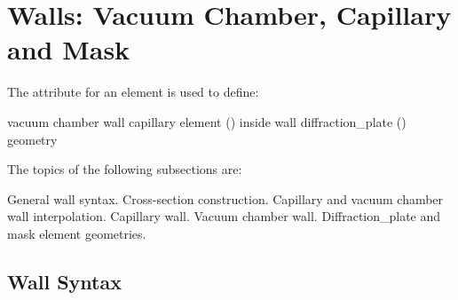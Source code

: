 \section{Walls: Vacuum Chamber, Capillary and Mask}
\label{s:wall}

The  attribute for an element is used to define:
\begin{example}
  vacuum chamber wall
  capillary element () inside wall
  diffraction_plate () geometry
\end{example}

The topics of the following subsections are:
\begin{example}
        General wall syntax.
        Cross-section construction. 
        Capillary and vacuum chamber wall interpolation.
        Capillary wall.
        Vacuum chamber wall.
        Diffraction_plate and mask element geometries.
\end{example}

\subsection{Wall Syntax}
\label{s:wall.syntax}

